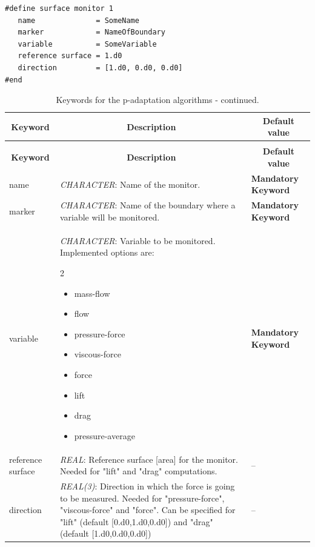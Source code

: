 \documentclass[a4paper,10pt]{report}
\begin{document}
\begin{lstlisting}
#define surface monitor 1
   name              = SomeName
   marker            = NameOfBoundary
   variable          = SomeVariable
   reference surface = 1.d0
   direction         = [1.d0, 0.d0, 0.d0]
#end
\end{lstlisting}

\begin{longtable}{|p{4cm}|p{10cm}|p{2.2cm}|}
\caption{Keywords for probes.} \label{tab:SurfaceMonitorKey} \\
\hline
\multicolumn{1}{|c|}{\textbf{Keyword}} & \multicolumn{1}{c|}{\textbf{Description}} & \multicolumn{1}{c|}{\textbf{Default value}} \\ \hline
\endfirsthead

\caption{Keywords for the p-adaptation algorithms - continued.} \\
\hline
\multicolumn{1}{|c|}{\textbf{Keyword}} & \multicolumn{1}{c|}{\textbf{Description}} & \multicolumn{1}{c|}{\textbf{Default value}} \\ \hline
\endhead

name 	&
			\textit{CHARACTER}: Name of the monitor. &
							\textbf{Mandatory Keyword} \\ \hline

marker &
			\textit{CHARACTER}: Name of the boundary where a variable will be monitored. &
							\textbf{Mandatory Keyword} \\ \hline

variable 	&
			\textit{CHARACTER}: Variable to be monitored. Implemented options are:\
\begin{multicols}{2}
\begin{itemize}
\item mass-flow
\item flow
\item pressure-force
\item viscous-force
\item force
\item lift
\item drag
\item pressure-average
\end{itemize}
\end{multicols}
			 &
							\textbf{Mandatory Keyword} \\ \hline

reference surface 	&
			\textit{REAL}: Reference surface [area] for the monitor. Needed for "lift" and "drag" computations. &
							-- \\ \hline

direction 	&
			\textit{REAL(3)}: Direction in which the force is going to be measured. Needed for "pressure-force", "viscous-force" and "force". Can be specified for "lift" (default [0.d0,1.d0,0.d0]) and "drag" (default [1.d0,0.d0,0.d0])   &
							-- \\ \hline
\end{longtable}
\end{document}

